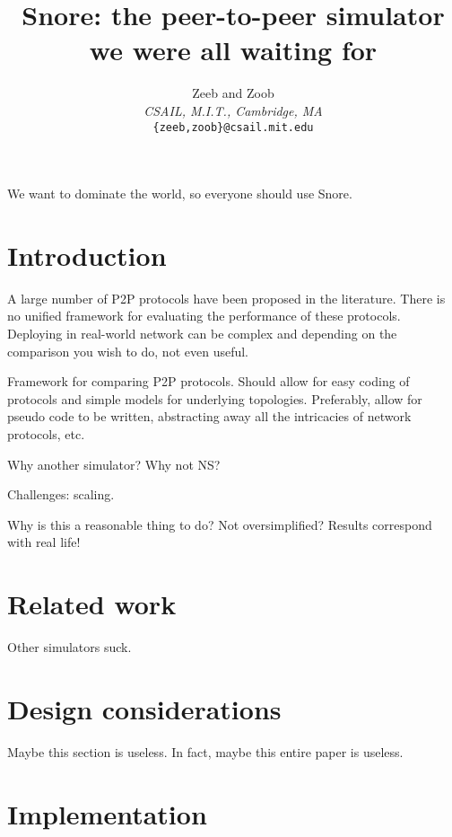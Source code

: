 \documentclass[letterpaper,twocolumn,10pt]{article}
\title{\Large \bf Snore: the peer-to-peer simulator we were all waiting for}
\author{Zeeb and Zoob \\
{\em CSAIL, M.I.T., Cambridge, MA} \\
{\tt \{zeeb,zoob\}@csail.mit.edu}}
\date{}
\begin{document}
\maketitle

\begin{abstract}
\end{abstract}

We want to dominate the world, so everyone should use Snore.

\thispagestyle{empty}
\section{Introduction}
\label{Section:Introduction}

A large number of P2P protocols have been proposed in the literature.  There
is no unified framework for evaluating the performance of these protocols.
Deploying in real-world network can be complex and depending on the comparison
you wish to do, not even useful.

Framework for comparing P2P protocols.  Should allow for easy coding of
protocols and simple models for underlying topologies.  Preferably, allow for
pseudo code to be written, abstracting away all the intricacies of network
protocols, etc.

Why another simulator?  Why not NS?

Challenges: scaling.

Why is this a reasonable thing to do?  Not oversimplified?  Results correspond
with real life!

\section{Related work}
\label{Section:Related}

Other simulators suck.

\section{Design considerations}
\label{Section:Design}

Maybe this section is useless.  In fact, maybe this entire paper is useless.


\section{Implementation}
\label{Section:Implementation}
\end{document}
